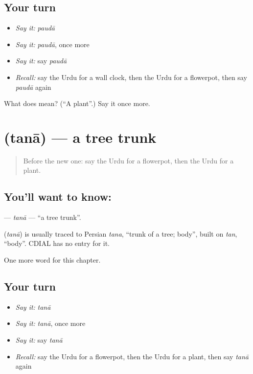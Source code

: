 \subsection*{Your turn}
\begin{itemize}
\raggedright
  \item \emph{Say it:} \emph{paudā}
  \item \emph{Say it:} \emph{paudā}, once more
  \item \emph{Say it:} say \emph{paudā}
  \item \emph{Recall:} say the Urdu for a wall clock, then the Urdu for a flowerpot, then say \emph{paudā} again
\end{itemize}

\begin{tcolorbox}[breakable,colback=teal!4,colframe=teal!35!black,title={Before you move on}]
What does  mean? (\textquotedblleft{}A plant\textquotedblright{}.) Say it once more.
\end{tcolorbox}
\section[\texorpdfstring{\ur{تنا} (tanā)}{تنا (tanā)}]{ (tanā) — a tree trunk}

\label{lesson:UR-C173-tana}



\begin{quote}
Before the new one: say the Urdu for a flowerpot, then the Urdu for a plant.
\end{quote}

\subsection*{You'll want to know: }
\textbf{} — \emph{tanā} — \textquotedblleft{}a tree trunk\textquotedblright{}.

\begin{cousinweb}
\textbf{} (\emph{tanā}) is usually traced to Persian \emph{tana}, \textquotedblleft{}trunk of a tree; body\textquotedblright{}, built on \emph{tan}, \textquotedblleft{}body\textquotedblright{}. CDIAL has no entry for it.
\end{cousinweb}

\begin{grammarlens}[title={What you've built}]
One more word for this chapter.
\end{grammarlens}

\subsection*{Your turn}
\begin{itemize}
\raggedright
  \item \emph{Say it:} \emph{tanā}
  \item \emph{Say it:} \emph{tanā}, once more
  \item \emph{Say it:} say \emph{tanā}
  \item \emph{Recall:} say the Urdu for a flowerpot, then the Urdu for a plant, then say \emph{tanā} again
\end{itemize}

